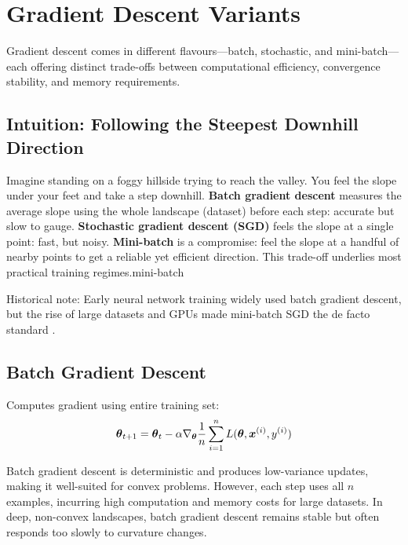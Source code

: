 
\section{Gradient Descent Variants }
\label{sec:gd-variants}

Gradient descent comes in different flavours—batch, stochastic, and mini-batch—each offering distinct trade-offs between computational efficiency, convergence stability, and memory requirements.

\subsection{Intuition: Following the Steepest Downhill Direction}

Imagine standing on a foggy hillside trying to reach the valley. You feel the slope under your feet and take a step downhill. \textbf{Batch gradient descent} measures the average slope using the whole landscape (dataset) before each step: accurate but slow to gauge. \textbf{Stochastic gradient descent (SGD)} feels the slope at a single point: fast, but noisy. \textbf{Mini-batch} is a compromise: feel the slope at a handful of nearby points to get a reliable yet efficient direction. This trade-off underlies most practical training regimes.\gls{mini-batch}

Historical note: Early neural network training widely used batch gradient descent, but the rise of large datasets and GPUs made mini-batch SGD the de facto standard \cite{GoodfellowEtAl2016,Prince2023}.

\subsection{Batch Gradient Descent}

Computes gradient using entire training set:
\begin{equation}
\boldsymbol{\theta}_{t+1} = \boldsymbol{\theta}_t - \alpha \nabla_{\boldsymbol{\theta}} \frac{1}{n} \sum_{i=1}^{n} L(\boldsymbol{\theta}, \boldsymbol{x}^{(i)}, y^{(i)})
\end{equation}

Batch gradient descent is deterministic and produces low-variance updates, making it well-suited for convex problems. However, each step uses all \(n\) examples, incurring high computation and memory costs for large datasets. In deep, non-convex landscapes, batch gradient descent remains stable but often responds too slowly to curvature changes.

